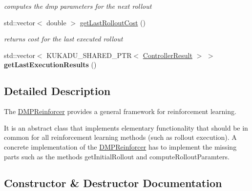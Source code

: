 \begin{DoxyCompactItemize}
\begin{DoxyCompactList}\small\item\em computes the dmp parameters for the next rollout \end{DoxyCompactList}\item 
std\+::vector$<$ double $>$ \hyperlink{classkukadu_1_1DMPReinforcer_ae1e7b4f023979e5076897102a54066c3}{get\+Last\+Rollout\+Cost} ()\hypertarget{classkukadu_1_1DMPReinforcer_ae1e7b4f023979e5076897102a54066c3}{}\label{classkukadu_1_1DMPReinforcer_ae1e7b4f023979e5076897102a54066c3}

\begin{DoxyCompactList}\small\item\em returns cost for the last executed rollout \end{DoxyCompactList}\item 
std\+::vector$<$ K\+U\+K\+A\+D\+U\+\_\+\+S\+H\+A\+R\+E\+D\+\_\+\+P\+TR$<$ \hyperlink{classkukadu_1_1ControllerResult}{Controller\+Result} $>$ $>$ {\bfseries get\+Last\+Execution\+Results} ()\hypertarget{classkukadu_1_1DMPReinforcer_a53f28e972c75ec336d55aee227ba5b30}{}\label{classkukadu_1_1DMPReinforcer_a53f28e972c75ec336d55aee227ba5b30}

\end{DoxyCompactItemize}


\subsection{Detailed Description}
The \hyperlink{classkukadu_1_1DMPReinforcer}{D\+M\+P\+Reinforcer} provides a general framework for reinforcement learning. 

It is an abstract class that implements elementary functionality that should be in common for all reinforcement learning methods (such as rollout execution). A concrete implementation of the \hyperlink{classkukadu_1_1DMPReinforcer}{D\+M\+P\+Reinforcer} has to implement the missing parts such as the methods get\+Initial\+Rollout and compute\+Rollout\+Paramters. 

\subsection{Constructor \& Destructor Documentation}
